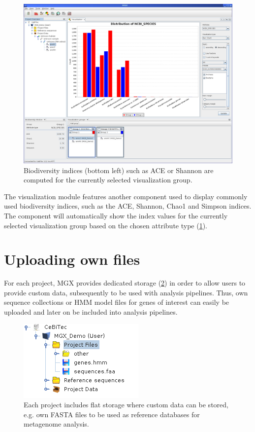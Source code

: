 \begin{figure}[H]
\centering
\includegraphics[width=\textwidth]{img/mgx/BioDiversity}
\caption[Biodiversity]{Biodiversity indices (bottom left) such as ACE or Shannon are computed for the currently
selected visualization group.}
\label{biodiv}
\end{figure}

The visualization module features another component used to display commonly used biodiversity indices, such as
the ACE, Shannon\cite{SHANNON}, Chao1\cite{DIVERSITY} and Simpson\cite{SIMPSON} indices. The component will automatically show the index values for the
currently selected visualization group based on the chosen attribute type (\ref{biodiv}).


\section{Uploading own files}

For each project, MGX provides dedicated storage (\ref{serverfs}) in order to allow users to
provide custom data, subsequently to be used with analysis pipelines. Thus,
own sequence collections or HMM model files for genes of interest can easily
be uploaded and later on be included into analysis pipelines.\\

\begin{figure}[H]
\centering
\includegraphics[width=.45\textwidth]{img/mgx/serverfs}
\caption[File storage]{Each project includes flat storage where custom
data can be stored, e.g. own FASTA files to be used as reference databases
for metagenome analysis.}
\label{serverfs}
\end{figure}


